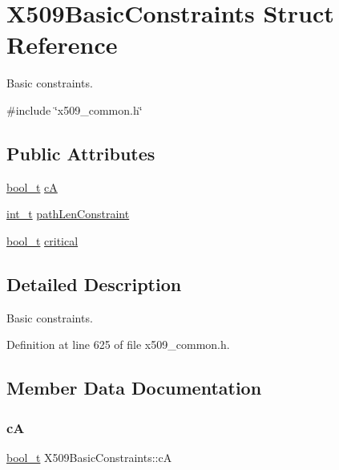 \hypertarget{structX509BasicConstraints}{}\section{X509\+Basic\+Constraints Struct Reference}
\label{structX509BasicConstraints}


Basic constraints.  




{\ttfamily \#include \char`\"{}x509\+\_\+common.\+h\char`\"{}}

\subsection*{Public Attributes}
\begin{DoxyCompactItemize}
\item 
\hyperlink{compiler__port_8h_a812d16e5494522586b3784e55d479912}{bool\+\_\+t} \hyperlink{structX509BasicConstraints_afcfd439b65fdffa3e6fd07e6a46e9d7d}{cA}
\item 
\hyperlink{compiler__port_8h_a022c65af7f6c8d3947e8a37d64db6ad6}{int\+\_\+t} \hyperlink{structX509BasicConstraints_a13c129a1b79a0a489604e28d69dd0950}{path\+Len\+Constraint}
\item 
\hyperlink{compiler__port_8h_a812d16e5494522586b3784e55d479912}{bool\+\_\+t} \hyperlink{structX509BasicConstraints_a188f2fcfc8d1a8da81a6361affeb66e8}{critical}
\end{DoxyCompactItemize}


\subsection{Detailed Description}
Basic constraints. 

Definition at line 625 of file x509\+\_\+common.\+h.



\subsection{Member Data Documentation}
\mbox{\label{structX509BasicConstraints_afcfd439b65fdffa3e6fd07e6a46e9d7d}} 
\subsubsection{\texorpdfstring{cA}{cA}}
{\footnotesize\ttfamily \hyperlink{compiler__port_8h_a812d16e5494522586b3784e55d479912}{bool\+\_\+t} X509\+Basic\+Constraints\+::cA}



